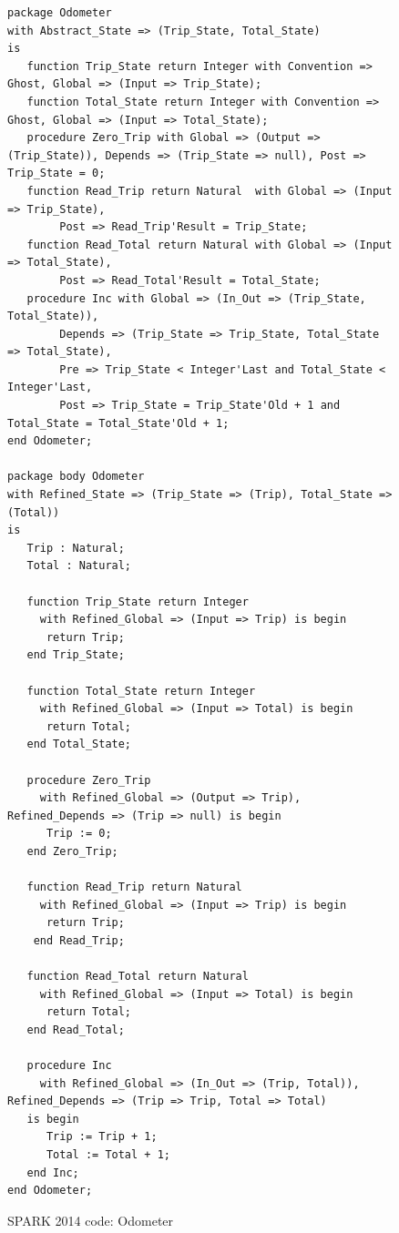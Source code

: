 \begin{figure}%
\singlespacing
\begin{lstlisting}[language=ada2012, frame=single, gobble=0]
package Odometer
with Abstract_State => (Trip_State, Total_State)
is
   function Trip_State return Integer with Convention => Ghost, Global => (Input => Trip_State);
   function Total_State return Integer with Convention => Ghost, Global => (Input => Total_State);
   procedure Zero_Trip with Global => (Output => (Trip_State)), Depends => (Trip_State => null), Post => Trip_State = 0;
   function Read_Trip return Natural  with Global => (Input => Trip_State), 
   		Post => Read_Trip'Result = Trip_State;
   function Read_Total return Natural with Global => (Input => Total_State), 
   		Post => Read_Total'Result = Total_State;
   procedure Inc with Global => (In_Out => (Trip_State, Total_State)), 
   		Depends => (Trip_State => Trip_State, Total_State => Total_State), 
   		Pre => Trip_State < Integer'Last and Total_State < Integer'Last, 
   		Post => Trip_State = Trip_State'Old + 1 and Total_State = Total_State'Old + 1;
end Odometer;

package body Odometer
with Refined_State => (Trip_State => (Trip), Total_State => (Total))
is
   Trip : Natural;
   Total : Natural;

   function Trip_State return Integer
     with Refined_Global => (Input => Trip) is begin
      return Trip;
   end Trip_State;

   function Total_State return Integer
     with Refined_Global => (Input => Total) is begin
      return Total;
   end Total_State;

   procedure Zero_Trip
     with Refined_Global => (Output => Trip), Refined_Depends => (Trip => null) is begin
      Trip := 0;
   end Zero_Trip;

   function Read_Trip return Natural
     with Refined_Global => (Input => Trip) is begin
      return Trip;
    end Read_Trip;

   function Read_Total return Natural
     with Refined_Global => (Input => Total) is begin
      return Total;
   end Read_Total;

   procedure Inc
     with Refined_Global => (In_Out => (Trip, Total)), Refined_Depends => (Trip => Trip, Total => Total)
   is begin
      Trip := Trip + 1;
      Total := Total + 1;
   end Inc;
end Odometer;
\end{lstlisting}
\doublespacing
\caption{SPARK 2014 code: Odometer}
\label{listing:Odometer2014}
\end{figure}

